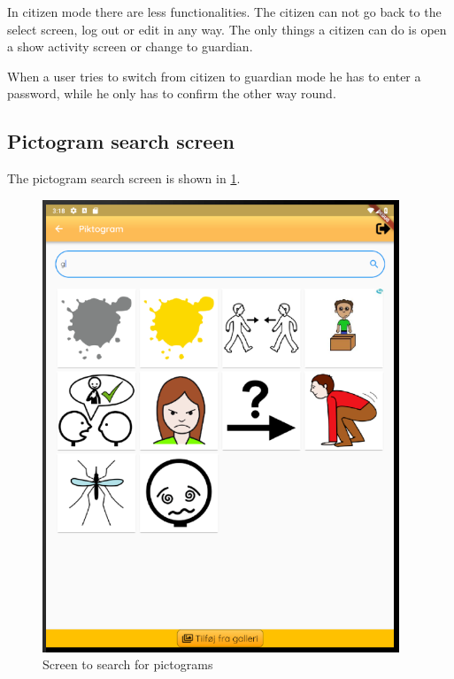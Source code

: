 In citizen mode there are less functionalities. The citizen can not go back to the select screen, log out or edit in any way. The only things a citizen can do is open a show activity screen or change to guardian. 

When a user tries to switch from citizen to guardian mode he has to enter a password, while he only has to confirm the other way round. 

\subsection{Pictogram search screen}
The pictogram search screen is shown in \ref{fig:finalPictogramSeach}.

\begin{figure}[H]
    \begin{center}
        \includegraphics[width=0.95\textwidth]{figures/FinalScreen/addPictogramScreen.png}
    \end{center}
    \caption{Screen to search for pictograms}
    \label{fig:finalPictogramSeach}
\end{figure}

